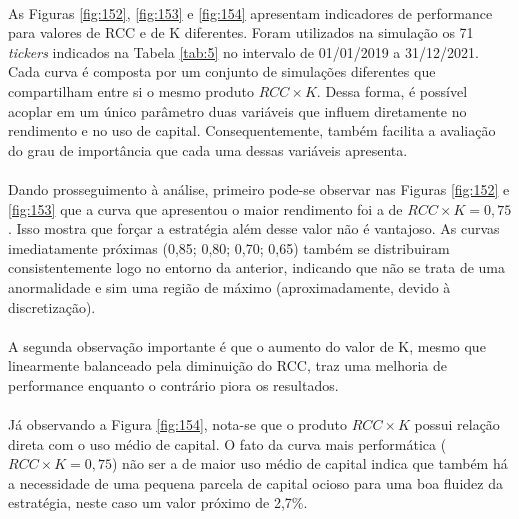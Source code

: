 \paragraph{} As Figuras \ref{fig:152}, \ref{fig:153} e \ref{fig:154} apresentam indicadores de performance para valores de RCC e de K diferentes. Foram utilizados na simulação os 71 \textit{tickers} indicados na Tabela \ref{tab:5} no intervalo de 01/01/2019 a 31/12/2021. Cada curva é composta por um conjunto de simulações diferentes que compartilham entre si o mesmo produto \begin{math} RCC \times K \end{math}. Dessa forma, é possível acoplar em um único parâmetro duas variáveis que influem diretamente no rendimento e no uso de capital. Consequentemente, também facilita a avaliação do grau de importância que cada uma dessas variáveis apresenta.

\paragraph{} Dando prosseguimento à análise, primeiro pode-se observar nas Figuras \ref{fig:152} e \ref{fig:153} que a curva que apresentou o maior rendimento foi a de \begin{math} RCC \times K = 0,75 \end{math}. Isso mostra que forçar a estratégia além desse valor não é vantajoso. As curvas imediatamente próximas (0,85; 0,80; 0,70; 0,65) também se distribuiram consistentemente logo no entorno da anterior, indicando que não se trata de uma anormalidade e sim uma região de máximo (aproximadamente, devido à discretização).

\paragraph{} A segunda observação importante é que o aumento do valor de K, mesmo que linearmente balanceado pela diminuição do RCC, traz uma melhoria de performance enquanto o contrário piora os resultados.

\paragraph{} Já observando a Figura \ref{fig:154}, nota-se que o produto \begin{math} RCC \times K \end{math} possui relação direta com o uso médio de capital. O fato da curva mais performática (\begin{math} RCC \times K = 0,75 \end{math}) não ser a de maior uso médio de capital indica que também há a necessidade de uma pequena parcela de capital ocioso para uma boa fluidez da estratégia, neste caso um valor próximo de 2,7\%.


